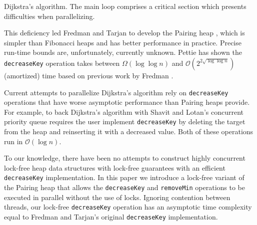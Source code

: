 \documentclass{acm_proc_article-sp}
\begin{document}
\begin{algorithm}[h]
\caption{Dijkstra's algorithm. The main loop comprises a critical section which presents difficulties when parallelizing.}
\label{alg:dijk}
\end{algorithm}

This deficiency led Fredman and Tarjan to develop the Pairing heap \cite{fredman86}, which
is simpler than Fibonacci heaps and has better performance in practice. Precise run-time bounds are, unfortunately, currently unknown. 
Pettie \cite{pettie05} has shown the \texttt{decreaseKey} operation takes between $\Omega(\log \log n)$ and $\mathcal{O}(2^{2\sqrt{\log\log n}})$ (amortized) time based on previous work by Fredman \cite{fredman99}.

Current attempts
to parallelize Dijkstra's algorithm rely on \texttt{decreaseKey} operations that have worse asymptotic performance
than Pairing heaps provide. For example, to back Dijkstra's algorithm with Shavit and Lotan's
concurrent priority queue \cite{shavit00} requires the user implement \texttt{decreaseKey} by deleting 
the target from the heap and reinserting it with a decreased value. Both of these operations run in
$\mathcal{O}(\log n)$.

To our knowledge, there have been no attempts to construct highly concurrent
lock-free heap data structures
with lock-free guarantees with an efficient \texttt{decreaseKey} implementation.
In this paper we introduce a lock-free variant of the Pairing heap
that allows the \texttt{decreaseKey} and \texttt{removeMin} operations
to be executed in parallel
without the use of locks. Ignoring contention between threads,
our lock-free \texttt{decreaseKey} operation has an asymptotic time complexity
equal to Fredman and Tarjan's original \texttt{decreaseKey} implementation.
\end{document}
